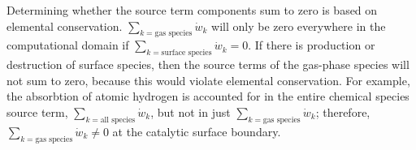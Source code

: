 \documentclass{report}
\begin{document}
\begin{enumerate}[label=(\alph*)]
    Determining whether the source term components sum to zero is based on
    elemental conservation.  $\sum_{k=\text{gas species}}{\dot{w}_k}$ will only
    be zero everywhere in the computational domain if $\sum_{k=\text{surface
    species}}{\dot{w}_k} = 0$.  If there is production or destruction of surface
    species, then the source terms of the gas-phase species will not sum to
    zero, because this would violate elemental conservation. For example, the
    absorbtion of atomic hydrogen is accounted for in the entire chemical
    species source term, $\sum_{k=\text{all species}}{\dot{w}_k}$, but not in
    just $\sum_{k=\text{gas species}}{\dot{w}_k}$; therefore,
    $\sum_{k=\text{gas species}}{\dot{w}_k} \ne 0$ at the catalytic surface
    boundary. 

\end{enumerate}
\end{document}
